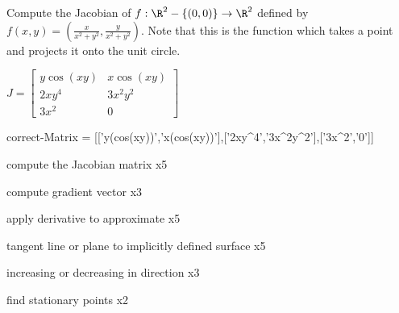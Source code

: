 \documentclass{ximera}
\begin{document}
	\begin{question}	
		Compute the Jacobian of $f:\R^2 - \{(0,0)\} \to \R^2$ defined by $f(x,y) = (\frac{x}{x^2+y^2},\frac{y}{x^2+y^2})$.  Note that this is the function which
		takes a point and projects it onto the unit circle. 
		\begin{solution}
		\begin{hint}
			\(J = \begin{bmatrix} y\cos(xy) & x\cos(xy) \\ 2xy^4 & 3x^2y^2 \\ 3x^2 & 0 \end{bmatrix}\)
		\end{hint}
		\begin{matrix-answer}[name=J]
			correct-Matrix  = [['y(cos(xy))','x(cos(xy))'],['2xy^4','3x^2y^2'],['3x^2','0']]
		\end{matrix-answer}
		\end{solution}
	\end{question}
	
	compute the Jacobian matrix x5
	
	compute gradient vector x3
	
	apply derivative to approximate x5
	
	tangent line or plane to implicitly defined surface x5
	
	increasing or decreasing in direction x3
	
	find stationary points x2
	
\end{document}
